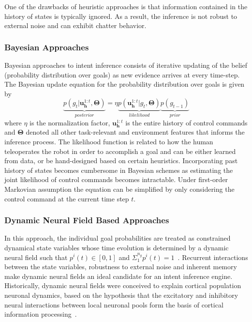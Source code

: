 \documentclass[conference]{IEEEtran}
\begin{document}
One of the drawbacks of heuristic approaches is that information contained in the history of states is typically ignored. As a result, the inference is not robust to external noise and can exhibit chatter behavior. 
\subsubsection{Bayesian Approaches}
Bayesian approaches to intent inference consists of iterative updating of the belief (probability distribution over goals) as new evidence arrives at every time-step. The Bayesian update equation for the probability distribution over goals is given by
\begin{equation*}
\underbrace{p(g_t| \boldsymbol{u}^{1:t}_{\boldsymbol{h}}, \boldsymbol{\Theta})}_{posterior} = \eta \underbrace{p(\boldsymbol{u}^{1:t}_{\boldsymbol{h}} | g_t, \boldsymbol{\Theta})}_{likelihood}\underbrace{p(g_{t-1})}_{prior}
\end{equation*}
where $\eta$ is the normalization factor, $\boldsymbol{u}^{1:t}_{\boldsymbol{h}}$ is the entire history of control commands and $\boldsymbol{\Theta}$ denoted all other task-relevant and environment features that informs the inference process. The likelihood function is related to how the human teleoperates the robot in order to accomplish a goal and can be either learned from data, or be hand-designed based on certain heuristics. Incorporating past history of states becomes cumbersome in Bayesian schemes as estimating the joint likelihood of control commands becomes intractable. Under first-order Markovian assumption the equation can be simplified by only considering the control command at the current time step $t$. 
\subsubsection{Dynamic Neural Field Based Approaches}
In this approach, the individual goal probabilities are treated as constrained dynamical state variables whose time evolution is determined by a dynamic neural field such that $p^i(t) \in [0, 1]$ and $\Sigma_{1}^{n_g}p^{i}(t) = 1$~\citep{gopinath2017disamb}. Recurrent interactions between the state variables, robustness to external noise and inherent memory make dynamic neural fields an ideal candidate for an intent inference engine. Historically, dynamic neural fields were conceived to explain cortical population neuronal dynamics, based on the hypothesis that the excitatory and inhibitory neural interactions between local neuronal pools form the basis of cortical information processing~\citep{schoner1995dynamics, schoner2008dynamical}. 
\end{document}
